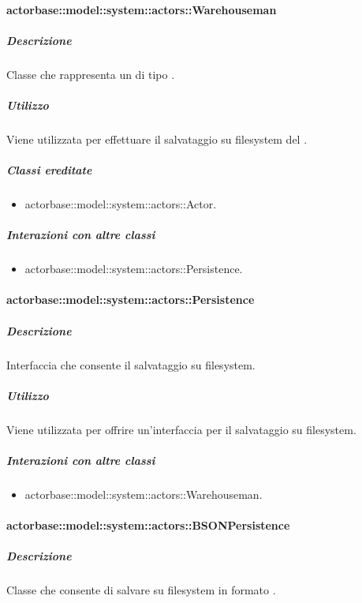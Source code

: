 \documentclass{scalatekids-article}
\begin{document}
\paragraph{actorbase::model::system::actors::Warehouseman}

\subparagraph{Descrizione}

Classe che rappresenta un  di tipo .

\subparagraph{Utilizzo}

Viene utilizzata per effettuare il salvataggio su filesystem del
.

\subparagraph{Classi ereditate}

\begin{itemize}
\item actorbase::model::system::actors::Actor.
\end{itemize}

\subparagraph{Interazioni con altre classi}

\begin{itemize}
\item actorbase::model::system::actors::Persistence.
\end{itemize}

\paragraph{actorbase::model::system::actors::Persistence}

\subparagraph{Descrizione}

Interfaccia che consente il salvataggio su filesystem.

\subparagraph{Utilizzo}

Viene utilizzata per offrire un'interfaccia per il salvataggio su filesystem.

\subparagraph{Interazioni con altre classi}

\begin{itemize}
\item actorbase::model::system::actors::Warehouseman.
\end{itemize}

\paragraph{actorbase::model::system::actors::BSONPersistence}

\subparagraph{Descrizione}

Classe che consente di salvare su filesystem in formato .
\end{document}
